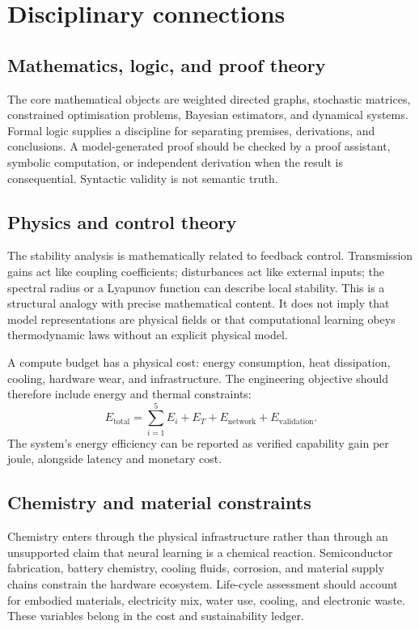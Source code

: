 \documentclass[11pt,a4paper]{article}
\begin{document}
\section{Disciplinary connections}

\subsection{Mathematics, logic, and proof theory}

The core mathematical objects are weighted directed graphs, stochastic matrices, constrained optimisation problems, Bayesian estimators, and dynamical systems. Formal logic supplies a discipline for separating premises, derivations, and conclusions. A model-generated proof should be checked by a proof assistant, symbolic computation, or independent derivation when the result is consequential. Syntactic validity is not semantic truth.

\subsection{Physics and control theory}

The stability analysis is mathematically related to feedback control. Transmission gains act like coupling coefficients; disturbances act like external inputs; the spectral radius or a Lyapunov function can describe local stability. This is a structural analogy with precise mathematical content. It does not imply that model representations are physical fields or that computational learning obeys thermodynamic laws without an explicit physical model.

A compute budget has a physical cost: energy consumption, heat dissipation, cooling, hardware wear, and infrastructure. The engineering objective should therefore include energy and thermal constraints:
\begin{equation}
E_{\mathrm{total}}
=
\sum_{i=1}^{5}E_i+E_T+E_{\mathrm{network}}+E_{\mathrm{validation}}.
\end{equation}
The system's energy efficiency can be reported as verified capability gain per joule, alongside latency and monetary cost.

\subsection{Chemistry and material constraints}

Chemistry enters through the physical infrastructure rather than through an unsupported claim that neural learning is a chemical reaction. Semiconductor fabrication, battery chemistry, cooling fluids, corrosion, and material supply chains constrain the hardware ecosystem. Life-cycle assessment should account for embodied materials, electricity mix, water use, cooling, and electronic waste. These variables belong in the cost and sustainability ledger.
\end{document}
